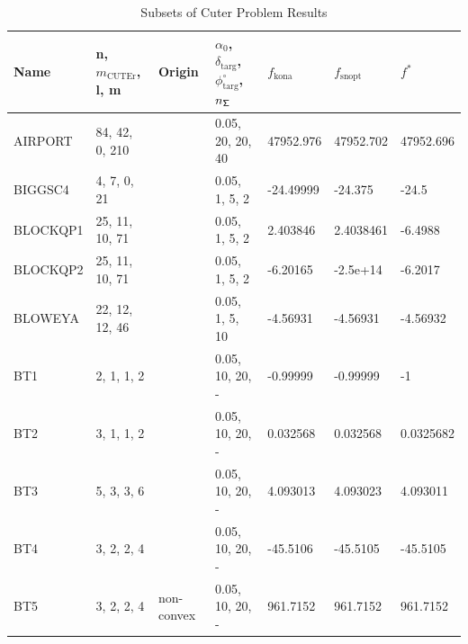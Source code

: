 \begin{landscape}
\begin{longtable}{l | l |  l  |  >{\footnotesize}p{3cm} | l | l | l    }      %
\caption{Subsets of Cuter Problem Results}\label{tab:cuter} \\
 \hline 
Name      &  n,  $m_{\text{CUTEr}}$, l,  m        &     Origin      &\textbf{$\alpha_0$},  $\delta_{\text{targ}}$, $\phi^{\circ}_{\text{targ}}$,  $n_{\mathsf{\Sigma}}$      & $ f_{\text{kona}} $   & $ f_{\text{snopt}} $ &$ f^*$    \\ \hline
AIRPORT    &  84,  42, 0, 210  &    &  0.05, 20, 20, 40 & 47952.976  & 47952.702  & 47952.696   \\ \hline
BIGGSC4    &  4, 7, 0, 21  &    & 0.05, 1, 5, 2  &  -24.49999  & -24.375   & -24.5    \\ \hline
BLOCKQP1 &  25, 11, 10, 71  &     & 0.05, 1, 5, 2 & 2.403846   & 2.4038461  &  -6.4988    \\ \hline
BLOCKQP2  &  25, 11, 10, 71  &     & 0.05, 1, 5, 2 & -6.20165    & -2.5e+14  & -6.2017    \\ \hline
BLOWEYA &  22, 12, 12, 46  &      &   0.05, 1, 5, 10  & -4.56931  & -4.56931   & -4.56932   \\ \hline
BT1    &   2, 1, 1, 2  & &  0.05, 10, 20, -    &  -0.99999  & -0.99999   & -1   \\ \hline
BT2    &3, 1, 1, 2  & & 0.05, 10, 20, -   & 0.032568  &  0.032568  & 0.0325682  \\ \hline
BT3    &5, 3, 3, 6 & & 0.05, 10, 20, -   &  4.093013  &  4.093023  & 4.093011 \\ \hline
BT4   &     3, 2, 2, 4 & & 0.05, 10, 20, -   & -45.5106  &  -45.5105  & -45.5105  \\ \hline
BT5   &   3, 2, 2, 4  & non-convex& 0.05, 10, 20, -  & 961.7152  &  961.7152  & 961.7152    \\ \hline

\end{longtable}
\end{landscape}
